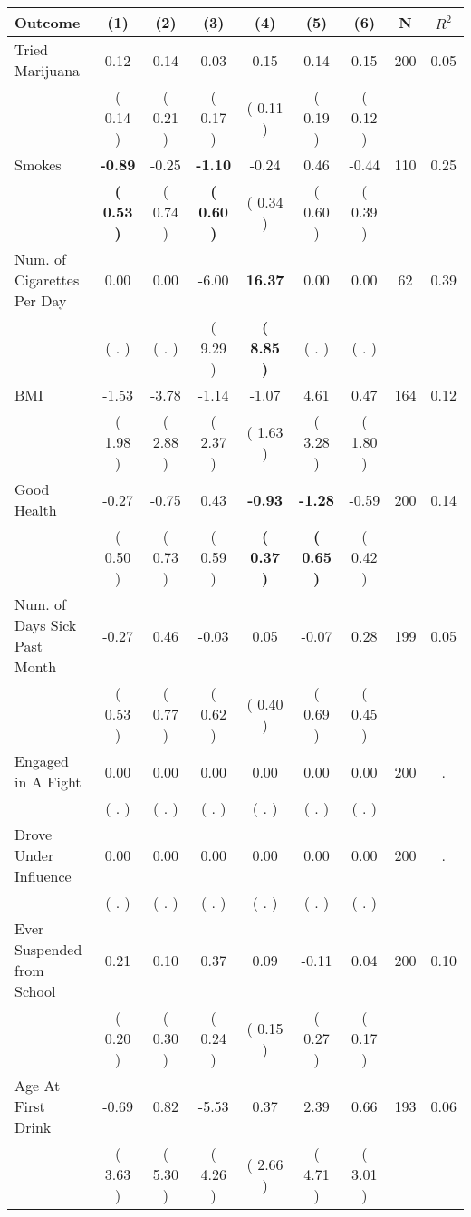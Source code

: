 \begin{tabular}{lcccccccc}
\toprule
 \textbf{Outcome} & \textbf{(1)} & \textbf{(2)} & \textbf{(3)} & \textbf{(4)} & \textbf{(5)} & \textbf{(6)} & \textbf{N} & \textbf{$ R^2$} \\
\midrule
Tried Marijuana &      0.12 &      0.14 &      0.03 &      0.15 &      0.14 &      0.15 & 200 &       0.05 \\ 
 & (     0.14 ) & (     0.21 ) & (     0.17 ) & (     0.11 ) & (     0.19 ) & (     0.12 ) & \\
Smokes & \textbf{    -0.89} &     -0.25 & \textbf{    -1.10} &     -0.24 &      0.46 &     -0.44 & 110 &       0.25 \\ 
 & \textbf{(     0.53 )} & (     0.74 ) & \textbf{(     0.60 )} & (     0.34 ) & (     0.60 ) & (     0.39 ) & \\
Num. of Cigarettes Per Day &      0.00 &      0.00 &     -6.00 & \textbf{    16.37} &      0.00 &      0.00 & 62 &       0.39 \\ 
 & (        . ) & (        . ) & (     9.29 ) & \textbf{(     8.85 )} & (        . ) & (        . ) & \\
BMI &     -1.53 &     -3.78 &     -1.14 &     -1.07 &      4.61 &      0.47 & 164 &       0.12 \\ 
 & (     1.98 ) & (     2.88 ) & (     2.37 ) & (     1.63 ) & (     3.28 ) & (     1.80 ) & \\
Good Health &     -0.27 &     -0.75 &      0.43 & \textbf{    -0.93} & \textbf{    -1.28} &     -0.59 & 200 &       0.14 \\ 
 & (     0.50 ) & (     0.73 ) & (     0.59 ) & \textbf{(     0.37 )} & \textbf{(     0.65 )} & (     0.42 ) & \\
Num. of Days Sick Past Month &     -0.27 &      0.46 &     -0.03 &      0.05 &     -0.07 &      0.28 & 199 &       0.05 \\ 
 & (     0.53 ) & (     0.77 ) & (     0.62 ) & (     0.40 ) & (     0.69 ) & (     0.45 ) & \\
Engaged in A Fight &      0.00 &      0.00 &      0.00 &      0.00 &      0.00 &      0.00 & 200 &          . \\ 
 & (        . ) & (        . ) & (        . ) & (        . ) & (        . ) & (        . ) & \\
Drove Under Influence &      0.00 &      0.00 &      0.00 &      0.00 &      0.00 &      0.00 & 200 &          . \\ 
 & (        . ) & (        . ) & (        . ) & (        . ) & (        . ) & (        . ) & \\
Ever Suspended from School &      0.21 &      0.10 &      0.37 &      0.09 &     -0.11 &      0.04 & 200 &       0.10 \\ 
 & (     0.20 ) & (     0.30 ) & (     0.24 ) & (     0.15 ) & (     0.27 ) & (     0.17 ) & \\
Age At First Drink &     -0.69 &      0.82 &     -5.53 &      0.37 &      2.39 &      0.66 & 193 &       0.06 \\ 
 & (     3.63 ) & (     5.30 ) & (     4.26 ) & (     2.66 ) & (     4.71 ) & (     3.01 ) & \\
\bottomrule
\end{tabular}
